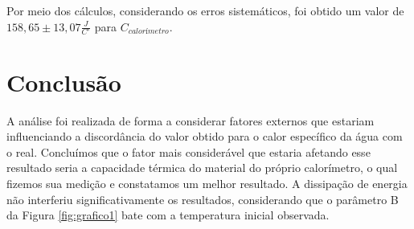 Por meio dos cálculos, considerando os erros sistemáticos, foi obtido um valor de $158,65\pm 13,07\frac{J}{C^{\circ}}$ para $C_{calorímetro}$.

\section{Conclusão}

A análise foi realizada de forma a considerar fatores externos que estariam influenciando a discordância do valor obtido para o calor específico da água com o real. Concluímos que o fator mais considerável que estaria afetando esse resultado seria a capacidade térmica do material do próprio calorímetro, o qual fizemos sua medição e constatamos um melhor resultado. A dissipação de energia não interferiu significativamente os resultados, considerando que o parâmetro B da Figura \ref{fig:grafico1} bate com a temperatura inicial observada. 

